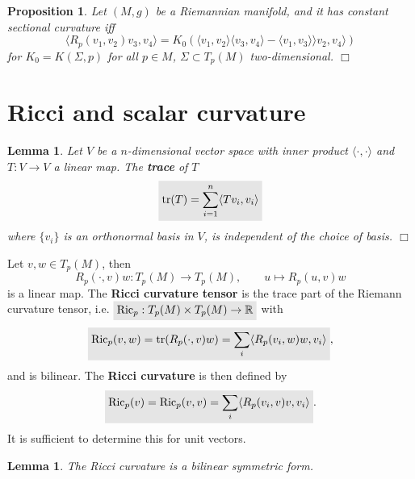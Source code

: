 \documentclass[letter-paper]{tufte-book}
\newtheorem{lemma}[theorem]{\color{pastel-blue}Lemma}
\newtheorem{proposition}[theorem]{\color{pastel-blue}Proposition}
\newcommand{\qedwhite}{\hfill \ensuremath{\Box}}
\newcommand{\highlight}[1]{\mathchoice%
  {\colorbox{black!10}{$\displaystyle#1$}}%
  {\colorbox{black!10}{$\textstyle#1$}}%
  {\colorbox{black!10}{$\scriptstyle#1$}}%
  {\colorbox{black!10}{$\scriptscriptstyle#1$}}}%
\begin{document}
\begin{proposition}
  Let $(M,g)$ be a Riemannian manifold, and it has constant sectional curvature iff
  \begin{equation}
    \langle R_p(v_1, v_2)v_3, v_4\rangle = K_0(\langle v_1, v_2\rangle \langle v_3, v_4\rangle - \langle v_1, v_3 \rangle \rangle v_2, v_4\rangle)
  \end{equation}
  for $K_0 = K(\Sigma, p)$ for all $p\in M$, $\Sigma \subset T_p(M)$ two-dimensional. \qedwhite
\end{proposition}


\section{Ricci and scalar curvature}

\begin{lemma}
  Let $V$ be a $n$-dimensional vector space with inner product $\langle\cdot,\cdot\rangle$ and $T: V\to V$ a linear map. The \textbf{trace} of $T$
  \begin{equation}
    \highlight{\mbox{tr}(T) = \sum_{i=1}^n \langle T v_i, v_i\rangle}
  \end{equation}
  where $\{v_i\}$ is an orthonormal basis in $V$, is independent of the choice of basis. \qedwhite
\end{lemma}

Let $v,w \in T_p(M)$, then
\begin{equation}
  R_p(\cdot, v)w: T_p(M)\to T_p(M), \qquad u\mapsto R_p(u,v)w
\end{equation}
is a linear map. The \textbf{Ricci curvature tensor} is the trace part of the Riemann curvature tensor, i.e. $\highlight{\mbox{Ric}_p: T_p(M)\times T_p(M) \to \mathbb{R}}$ with
\begin{equation}
  \highlight{\mbox{Ric}_p(v,w) = \mbox{tr}(R_p(\cdot, v)w) = \sum_i \langle R_p(v_i, w)w, v_i\rangle},
\end{equation}
and is bilinear. The \textbf{Ricci curvature} is then defined by
\begin{equation}
  \highlight{\mbox{Ric}_p(v) = \mbox{Ric}_p(v, v) = \sum_i \langle R_p(v_i, v)v, v_i\rangle}.
\end{equation}
It is sufficient to determine this for unit vectors.

\begin{lemma}
  The Ricci curvature is a bilinear symmetric form.
\end{lemma}
\end{document}
